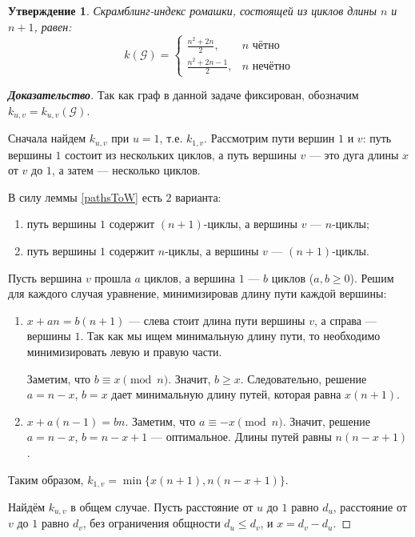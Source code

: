 \documentclass[12pt]{article}
\newtheorem{proposition}[theorem]{Утверждение}
\begin{document}
\begin{proposition}
Скрамблинг-индекс ромашки, состоящей из циклов длины $n$ и $n + 1$, равен: \begin{equation*}
k(\mathcal{G}) = \begin{cases}
        \frac{n^2 + 2n}{2},     & n \text{ чётно} \\
        \frac{n^2 + 2n - 1}{2}, & n \text{ нечётно}
    \end{cases}
\end{equation*}
\end{proposition}
\begin{proof}[\textbf{Доказательство}]
Так как граф в данной задаче фиксирован, обозначим $k_{u,v} = k_{u,v}(\mathcal{G})$.

Сначала найдем $k_{u, v}$ при $u = 1$, т.е. $k_{1,v}$. Рассмотрим пути вершин $1$ и $v$: путь вершины $1$ состоит из нескольких циклов, а путь вершины $v$ --- это дуга длины $x$ от $v$ до $1$, а затем --- несколько циклов.

В силу леммы \ref{pathsToW} есть $2$ варианта:\begin{enumerate}
\item путь вершины $1$ содержит $(n+1)$-циклы, а вершины $v$ --- $n$-циклы;
\item путь вершины $1$ содержит $n$-циклы, а вершины $v$ --- $(n+1)$-циклы.
\end{enumerate}
Пусть вершина $v$ прошла $a$ циклов, а вершина $1$ --- $b$ циклов ($a, b \ge 0$). Решим для каждого случая уравнение, минимизировав длину пути каждой вершины:
\begin{enumerate}
\item $x + an = b(n + 1)$ --- слева стоит длина пути вершины $v$, а справа --- вершины $1$. Так как мы ищем минимальную длину пути, то необходимо минимизировать левую и правую части.

Заметим, что $b \equiv x \pmod{n}$. Значит, $b \ge x$. Следовательно, решение $a = n - x$, $b = x$ дает минимальную длину путей, которая равна $x(n+1)$.
\item $x + a(n - 1) = bn$. Заметим, что $a \equiv -x \pmod{n}$. Значит, решение $a = n - x$, $b = n - x + 1$ --- оптимальное. Длины путей равны $n(n - x + 1)$.
\end{enumerate}
Таким образом, $k_{1,v} = \min \{x(n+1), n(n - x + 1)\}$.

Найдём $k_{u,v}$ в общем случае. Пусть расстояние от $u$ до $1$ равно $d_u$, расстояние от $v$ до $1$ равно $d_v$, без ограничения общности $d_u \le d_v$, и $x = d_v - d_u$.


\end{proof}
\end{document}
